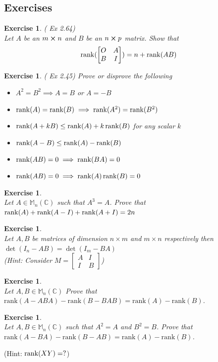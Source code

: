 \documentclass[12pt]{article}
\newcommand{\Rank}{\mathrm{rank}}
\theoremstyle{definition}
\theoremstyle{remark}
\theoremstyle{plain}
\newtheorem{ex}[subsubsection]{Exercise}
\begin{document}
\newpage
\subsection{Exercises}
\begin{ex}\textup{(\cite{Z} Ex 2.64)}\\
Let $A$ be an $m\cross n$ and $B$ be an $n \cross p$ matrix. Show that
$$\rank(\begin{bmatrix}
O & A\\ 
B& I
\end{bmatrix})=n+\rank(AB) $$

\end{ex}
\begin{ex}\textup{(\cite{Z} Ex 2.45)}
Prove or disprove the following
	\begin{itemize}
	\item $A^2=B^2 \implies A=B$ or $A=-B$
	\item $\rank(A)=\rank(B)\implies \rank(A^2)=\rank(B^2)$
	\item $\rank(A+kB)\leq \rank(A)+k\rank(B)$ for any scalar $k$
	\item $\rank(A-B)\leq \rank(A) - \rank(B)$
	\item $\rank(AB)=0 \implies \rank(BA)=0$
	\item $\rank(AB)=0 \implies \rank(A)\rank(B)=0 $




\end{itemize}
\end{ex}

\begin{ex}\leavevmode \\
Let $A\in \mathbb{M}_n(\mathbb{C})$ such that $A^3=A$. Prove that $\rank(A)+\rank(A-I)+\rank(A+I)=2n$

\end{ex}
\begin{ex}\leavevmode \\
    Let $A,B $ be matrices of dimension $n \times m$ and $ m \times n$ respectively then $ \det(I_n-AB)=\det(I_m-BA)$\\
    (Hint: Consider $M=\begin{bmatrix}
        A & I \\ I & B
    \end{bmatrix}$)
\end{ex}

\begin{ex}\leavevmode \\
    Let $A,B\in \mathbb{M}_n(\mathbb{C})$ Prove that
    $\Rank(A-ABA)-\Rank(B-BAB)=\Rank(A)-\Rank(B)$.
\end{ex}
\begin{ex}\leavevmode \\
    Let $A,B\in \mathbb{M}_n(\mathbb{C})$ such that $A^2=A$ and $B^2=B$. Prove that
    $\Rank(A-BA)-\Rank(B-AB)=\Rank(A)-\Rank(B)$.
\end{ex}
(Hint: $\rank(XY)=?$)
\end{document}
